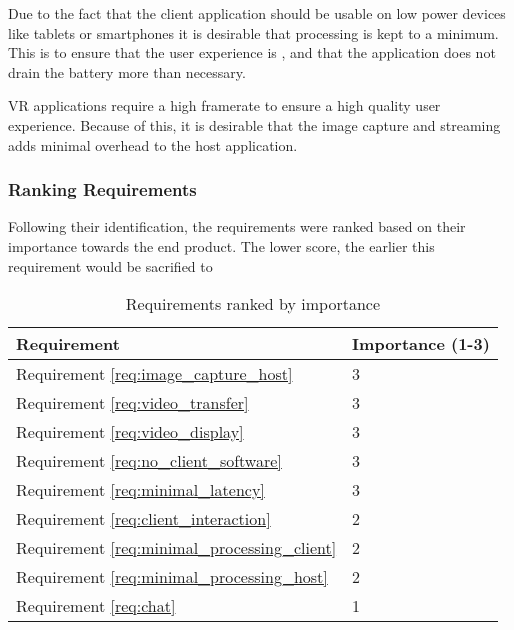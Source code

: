Due to the fact that the client application should be usable on low power devices like tablets or smartphones it is desirable that processing is kept to a minimum. This is to ensure that the user experience is , and that the application does not drain the battery more than necessary.

VR applications require a high framerate to ensure a high quality user experience. Because of this, it is desirable that the image capture and streaming adds minimal overhead to the host application.


\subsubsection{Ranking Requirements}
Following their identification, the requirements were ranked based on their importance towards the end product. The lower score, the earlier this requirement would be sacrified to 

\begin{table}[]
    \centering
    \begin{tabular}{ | l | l |}
        \hline
        Requirement & Importance (1-3) \\
        \hline
        Requirement \ref{req:image_capture_host}            & 3                 \\
        Requirement \ref{req:video_transfer}                & 3                 \\
        Requirement \ref{req:video_display}                 & 3                 \\
        Requirement \ref{req:no_client_software}            & 3                 \\
        Requirement \ref{req:minimal_latency}               & 3                 \\
        Requirement \ref{req:client_interaction}            & 2                 \\
        Requirement \ref{req:minimal_processing_client}     & 2                 \\
        Requirement \ref{req:minimal_processing_host}       & 2                 \\
        Requirement \ref{req:chat}                          & 1                 \\
        \hline
    \end{tabular}
    \caption{Requirements ranked by importance}
    \label{tab:requirements_ranking}
\end{table}

